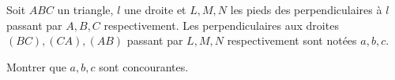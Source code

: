 Soit $ABC$ un triangle, $l$ une droite et $L, M, N$ les pieds des perpendiculaires à $l$ passant par $A, B, C$ respectivement. Les perpendiculaires aux droites $(BC), (CA), (AB)$ passant par $L, M, N$ respectivement sont notées $a, b, c$.

Montrer que $a, b, c$ sont concourantes.